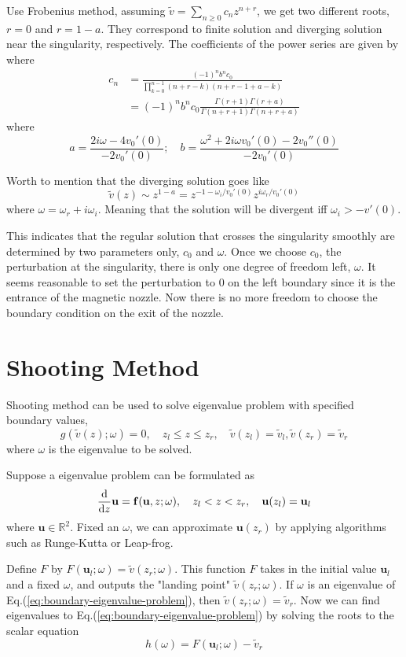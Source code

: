Use Frobenius method, assuming $\tilde{v} = \sum_{n\geq 0}c_nz^{n+r}$, we get two different roots, $r=0$ and $r=1-a$. They correspond to finite solution and diverging solution near the singularity, respectively. The coefficients of the power series are given by 
where 
\begin{align*}    
  c_n &= \frac{(-1)^n b^n c_0}{\prod_{k=0}^{n-1} (n+r-k)(n+r-1+a-k)} \\
      &= (-1)^n b^n c_0 \frac{\Gamma(r+1)\Gamma(r+a)}{\Gamma(n+r+1)\Gamma(n+r+a)}
\end{align*}
where
\[ a = \frac{2i\omega - 4v_0'(0)}{-2v_0'(0)}; \quad 
  b = \frac{\omega^2 + 2i\omega v_0'(0) - 2v_0''(0)}{-2v_0'(0)}
\]

Worth to mention that the diverging solution goes like 
\[ 
\tilde{v}(z) \sim z^{1-a} = z^{-1-\omega_i/v_0'(0)}z^{i\omega_r/v_0'(0)}  \]
where $\omega = \omega_r + i\omega_i$. Meaning that the solution will be divergent iff $\omega_i > -v'(0)$.

This indicates that the regular solution that crosses the singularity smoothly are determined by two parameters only, $c_0$ and $\omega$. Once we choose $c_0$, the perturbation at the singularity, there is only one degree of freedom left, $\omega$. It seems reasonable to set the perturbation to 0 on the left boundary since it is the entrance of the magnetic nozzle. Now there is no more freedom to choose the boundary condition on the exit of the nozzle. 

\section{Shooting Method}

Shooting method can be used to solve eigenvalue problem with specified boundary values,
\begin{equation} \label{eq:boundary-eigenvalue-problem}
g(\tilde{v}(z);\omega) = 0,
\quad
z_l \leq z \leq z_r,
\quad
\tilde{v}(z_l) = \tilde{v}_l, \tilde{v}(z_r) = \tilde{v}_r
\end{equation}
where $\omega$ is the eigenvalue to be solved.

Suppose a eigenvalue problem can be formulated as
\[ \dv{z}\mathbf{u} = \mathbf{f}(\mathbf{u},z;\omega),
\quad
z_l<z<z_r,
\quad
\mathbf{u}(z_l) = \mathbf{u}_l
\]
where $\mathbf{u}\in\mathbb{R}^2$. Fixed an $\omega$, we can approximate $\mathbf{u}(z_r)$ by applying algorithms such as Runge-Kutta or Leap-frog.

Define $F$ by $F(\mathbf{u}_l;\omega)=\tilde{v}(z_r;\omega)$. This function $F$ takes in the initial value $\mathbf{u}_l$ and a fixed $\omega$, and outputs the "landing point" $\tilde{v}(z_r;\omega)$. If $\omega$ is an eigenvalue of Eq.(\ref{eq:boundary-eigenvalue-problem}), then $\tilde{v}(z_r;\omega) = \tilde{v}_r$. Now we can find eigenvalues to Eq.(\ref{eq:boundary-eigenvalue-problem}) by solving the roots to the scalar equation
\[h(\omega) = F(\mathbf{u}_l;\omega) - \tilde{v}_r\]

